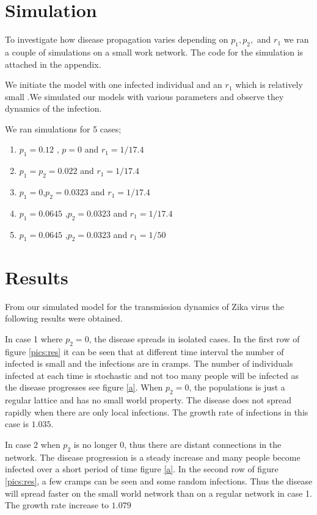 \section{Simulation}
To investigate how disease propagation varies depending on $p_1, p_2, $ and $r_1$ we ran a couple of simulations on a small work network. The code for the simulation is attached in the appendix. 

We initiate the model with one infected individual and an $r_1$ which is relatively small .We simulated our models with various parameters and observe they dynamics  of the infection. 

We ran simulations for 5 cases;
\begin{enumerate}
\item $p_1 = 0.12$ , $p =0$ and $r_1 = 1/17.4$
\item $p_1 = p_2 = 0.022$ and $r_1 = 1/17.4$ 
\item $p_1 =0 $,$p_2 = 0.0323$ and $r_1 = 1/17.4$
\item $p_1 = 0.0645$ ,$p_2 = 0.0323$ and $r_1 = 1/17.4$
\item $p_1 = 0.0645$ ,$p_2 = 0.0323$ and $r_1 = 1/50$
\end{enumerate}

\section{Results}
From our simulated model for the transmission dynamics of Zika virus the following results were obtained. 

In case 1 where $p_2 =0$, the disease spreads in isolated cases. In the first row of figure  \ref{pics:res} it can be seen that at different time interval the number of infected is small and  the infections are in cramps.  The number of individuals infected at each time is stochastic and not too many people will be infected as the disease progresses see figure \ref{a}.  When $p_2 = 0$, the populations is just a regular lattice and has no small world property. The disease does not spread rapidly when there are only local infections. The growth rate of infections in this case is $1.035$.

In case 2 when $p_2$ is no longer 0, thus  there are distant connections in the network. The disease progression is a steady increase and many people become infected over a short period of time figure \ref{a}. In the second row of figure \ref{pics:res}, a few cramps can be seen and some random infections.  Thus the disease will spread faster on the small world network than on a regular network in case 1. The growth rate increase to $1.079$


